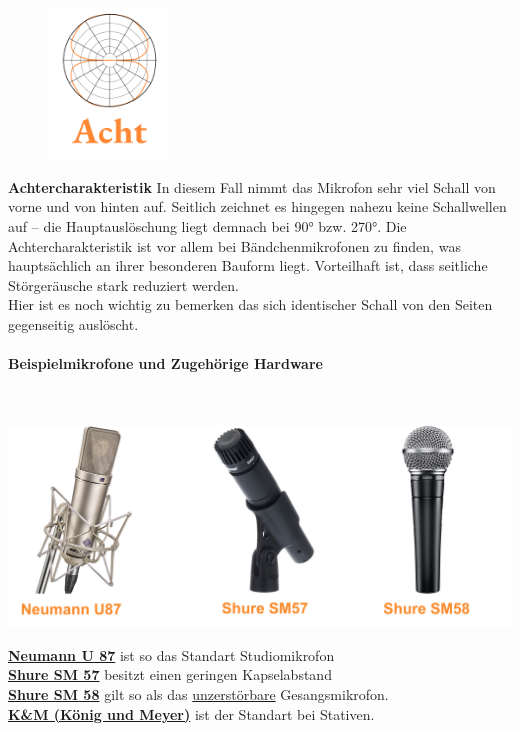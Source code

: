 \begin{figure}\vspace{-1cm}
\includegraphics[height=4cm]{Bilder/Medientechnik/Mikrocharakteristik_Acht.png}
\end{figure}
 \textbf{Achtercharakteristik} In diesem Fall nimmt das Mikrofon sehr viel Schall von vorne und von hinten auf. Seitlich zeichnet es hingegen nahezu keine Schallwellen auf – die Hauptauslöschung liegt demnach bei 90° bzw. 270°. Die Achtercharakteristik ist vor allem bei Bändchenmikrofonen zu finden, was hauptsächlich an ihrer besonderen Bauform liegt. Vorteilhaft ist, dass seitliche Störgeräusche stark reduziert werden.\\ Hier ist es noch wichtig zu bemerken das sich identischer Schall von den Seiten gegenseitig auslöscht.

 \paragraph{Beispielmikrofone und Zugehörige Hardware}~\\


\begin{center}
    \includegraphics[width=1\textwidth]{Bilder/Medientechnik/U87Sm57Sm58.png}\\
\end{center}
    \textbf{\href{https://www.neumann.com/de-de/produkte/microphones/u-87-ai/}{Neumann U 87}}\cite{NeumannU87:online} ist so das Standart Studiomikrofon\\
    \textbf{\href{https://www.shure.com/de-DE/produkte/mikrofone/sm57?variant=SM57-LCE}{Shure SM 57}} \cite{ShureSM57:online} besitzt einen geringen Kapselabstand\\
    \textbf{\href{https://www.shure.com/de-DE/produkte/mikrofone/sm58?variant=SM58-LCE&utm_source=google&utm_medium=cpc&utm_campaign=26-ao-mu-de-de-sl-jul24-conv-mco-brand&utm_term=sm58-prosp&utm_content=&vdr=sl&sfid=ao-mu&gad_source=1&gclid=CjwKCAjw5Ky1BhAgEiwA5jGujgRsHkHIH6hyjmigzxoFEGLfoI3Nk0UQ5E8CJrlKrQM2YeIal77KjRoCKhEQAvD_BwE}{Shure SM 58}} \cite{SM58:online} gilt so als das \href{ https://www.youtube.com/watch?v=Lz1_l_HJlPA&ab_channel=MusikersajtenStudio}{unzerstörbare} Gesangsmikrofon.\\
    \textbf{\href{https://www.k-m.de}{K\&M (König und Meyer)}} ist der Standart bei Stativen.  \newpage